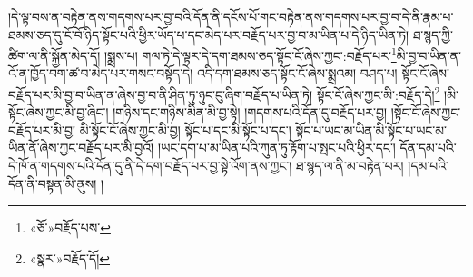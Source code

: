 །དེ་ལྟ་བས་ན་བརྟེན་ནས་གདགས་པར་བྱ་བའི་དོན་ནི་དངོས་པོ་གང་བརྟེན་ནས་གདགས་པར་བྱ་བ་དེ་ནི་རྣམ་པ་ཐམས་ཅད་དུ་ངོ་བོ་ཉིད་སྟོང་པའི་ཕྱིར་ཡོད་པ་དང་མེད་པར་བརྗོད་པར་བྱ་བ་མ་ཡིན་པ་དེ་ཉིད་ཡིན་ཏེ། ཐ་སྙད་ཀྱི་ཚིག་ལ་ནི་སྐྱོན་མེད་དོ། །སྨྲས་པ། གལ་ཏེ་དེ་ལྟར་དེ་དག་ཐམས་ཅད་སྟོང་ངོ་ཞེས་ཀྱང་:བརྗོད་པར་\footnote{«ཅོ་»བརྗོད་པས་}མི་བྱ་བ་ཡིན་ན་འོ་ན་ཁྱོད་བག་ཚ་བ་མེད་པར་གསང་བསྟོད་དེ། འདི་དག་ཐམས་ཅད་སྟོང་ངོ་ཞེས་སྨྲའམ། བཤད་པ། སྟོང་ངོ་ཞེས་བརྗོད་པར་མི་བྱ་བ་ཡིན་ན་ཞེས་བྱ་བ་ནི་ཤིན་ཏུ་ཉུང་ངུ་ཞིག་བརྗོད་པ་ཡིན་ཏེ། སྟོང་ངོ་ཞེས་ཀྱང་མི་:བརྗོད་དེ།\footnote{«སྣར་»བརྗོད་དོ།} །མི་སྟོང་ཞེས་ཀྱང་མི་བྱ་ཞིང་། །གཉིས་དང་གཉིས་མིན་མི་བྱ་སྟེ། །གདགས་པའི་དོན་དུ་བརྗོད་པར་བྱ། །སྟོང་ངོ་ཞེས་ཀྱང་བརྗོད་པར་མི་བྱ། མི་སྟོང་ངོ་ཞེས་ཀྱང་མི་བྱ། སྟོང་པ་དང་མི་སྟོང་པ་དང་། སྟོང་པ་ཡང་མ་ཡིན་མི་སྟོང་པ་ཡང་མ་ཡིན་ནོ་ཞེས་ཀྱང་བརྗོད་པར་མི་བྱའོ། །ཡང་དག་པ་མ་ཡིན་པའི་ཀུན་ཏུ་རྟོག་པ་སྤང་པའི་ཕྱིར་དང་། དོན་དམ་པའི་དེ་ཁོ་ན་གདགས་པའི་དོན་དུ་ནི་དེ་དག་བརྗོད་པར་བྱ་སྟེ་འོག་ནས་ཀྱང་། ཐ་སྙད་ལ་ནི་མ་བརྟེན་པར། །དམ་པའི་དོན་ནི་བསྟན་མི་ནུས། །
